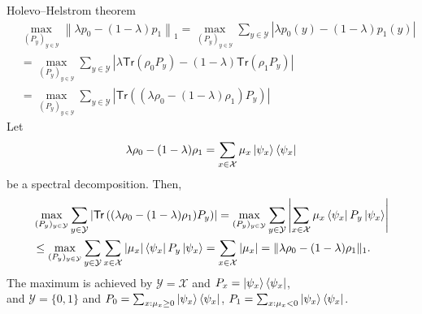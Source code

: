 \documentclass{beamer}
\newcommand{\Tr}{\mathsf{Tr}}
\begin{document}
\begin{frame}{Holevo--Helstrom theorem}
\scriptsize\vspace{-1em}
\begin{align*}
&\max_{(P_y)_{y\in\mathcal{Y}}} \left\|\lambda p_0 - (1-\lambda)p_1\right\|_1
= \max_{(P_y)_{y\in\mathcal{Y}}} \sum_{y\in\mathcal{Y}}\left|\lambda p_0(y) - (1-\lambda)p_1(y)\right|\\
&= \max_{(P_y)_{y\in\mathcal{Y}}} \sum_{y\in\mathcal{Y}}\left|\lambda \Tr(\rho_0 P_y) - (1-\lambda)\Tr(\rho_1 P_y)\right|\\
&= \max_{(P_y)_{y\in\mathcal{Y}}} \sum_{y\in\mathcal{Y}}\left|\Tr\left((\lambda\rho_0 - (1-\lambda)\rho_1) P_y\right)\right|
\end{align*}
Let
\begin{align*}
\lambda \rho_0 - (1-\lambda)\rho_1 = \sum_{x\in\mathcal{X}} \mu_x \ket{\psi_x}\bra{\psi_x}
\end{align*}
be a spectral decomposition. Then,
\begin{align*}
&\max_{(P_y)_{y\in\mathcal{Y}}} \sum_{y\in\mathcal{Y}}\left|\Tr\left((\lambda\rho_0 - (1-\lambda)\rho_1) P_y\right)\right|
=\max_{(P_y)_{y\in\mathcal{Y}}} \sum_{y\in\mathcal{Y}}\left|\sum_{x\in\mathcal{X}}\mu_x \bra{\psi_x} P_y\ket{\psi_x}\right|\\
&\le\max_{(P_y)_{y\in\mathcal{Y}}} \sum_{y\in\mathcal{Y}}\sum_{x\in\mathcal{X}}|\mu_x| \bra{\psi_x} P_y\ket{\psi_x}
=\sum_{x\in\mathcal{X}} |\mu_x|
=
\|\lambda \rho_0 - (1-\lambda)\rho_1\|_1.
\end{align*}
The maximum is achieved by $\mathcal{Y}=\mathcal{X}$ and $P_x = \ket{\psi_x}\bra{\psi_x}$,\\
and $\mathcal{Y}=\{0,1\}$ and $P_0 = \sum_{x: \mu_x\ge 0} \ket{\psi_x}\bra{\psi_x}$, $P_1 = \sum_{x: \mu_x< 0} \ket{\psi_x}\bra{\psi_x}$.
\end{frame}
\end{document}
